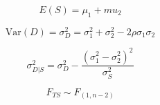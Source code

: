 \[ E(S) = \mu_1 + mu_2 \]

\[ \mbox{Var}(D) = \sigma^2_D = \sigma^2_1 + \sigma^2_2 - 2\rho\sigma_1\sigma_2 \]

\[ \sigma^2_{D|S} = \sigma^2_D  - \frac{(\sigma^2_1 - \sigma^2_2)^2}{\sigma^2_S} \]

\[ F_{TS} \sim F_{(1,n-2)} \]
